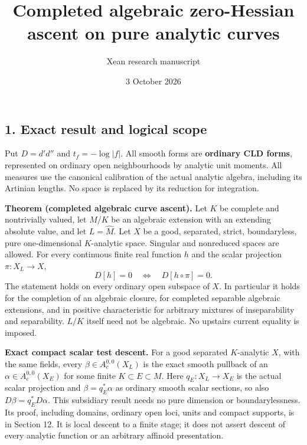 \documentclass[
  11pt,
]{article}
\title{Completed algebraic zero-Hessian ascent on pure analytic curves}
\author{Xean research manuscript}
\date{3 October 2026}
\begin{document}
\maketitle

\subsection{1. Exact result and logical
scope}\label{exact-result-and-logical-scope}

Put \(D=d'd''\) and \(t_f=-\log|f|\). All smooth forms are
\textbf{ordinary CLD forms}, represented on ordinary open neighbourhoods
by analytic unit moments. All measures use the canonical calibration of
the actual analytic algebra, including its Artinian lengths. No space is
replaced by its reduction for integration.

\textbf{Theorem (completed algebraic curve ascent).} Let \(K\) be
complete and nontrivially valued, let \(M/K\) be an algebraic extension
with an extending absolute value, and let \(L=\widehat M\). Let \(X\) be
a good, separated, strict, boundaryless, pure one-dimensional
\(K\)-analytic space. Singular and nonreduced spaces are allowed. For
every continuous finite real function \(h\) and the scalar projection
\(\pi:X_L\to X\), \[
             D[h]=0\quad\Longleftrightarrow\quad
             D[h\circ\pi]=0.                         \tag{1}
\] The statement holds on every ordinary open subspace of \(X\). In
particular it holds for the completion of an algebraic closure, for
completed separable algebraic extensions, and in positive characteristic
for arbitrary mixtures of inseparability and separability. \(L/K\)
itself need not be algebraic. No upstairs current equality is imposed.

\textbf{Exact compact scalar test descent.} For a good separated
\(K\)-analytic \(X\), with the same fields, every
\(\beta\in A_c^{0,0}(X_L)\) is the exact smooth pullback of an
\(\alpha\in A_c^{0,0}(X_E)\) for some finite \(K\subset E\subset M\).
Here \(q_E:X_L\to X_E\) is the actual scalar projection and
\(\beta=q_E^*\alpha\) as ordinary smooth scalar sections, so also
\(D\beta=q_E^*D\alpha\). This subsidiary result needs no pure dimension
or boundarylessness. Its proof, including domains, ordinary open loci,
units and compact supports, is in Section 12. It is local descent to a
finite stage; it does not assert descent of every analytic function or
an arbitrary affinoid presentation.
\end{document}
